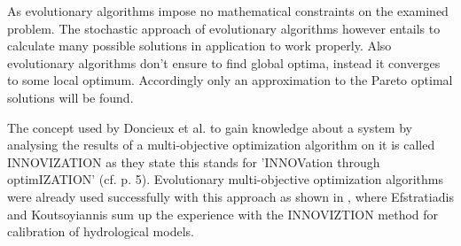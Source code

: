\documentclass[12pt,twoside]{article}
\theoremstyle{plain}
\theoremstyle{definition}
\theoremstyle{remark}
\begin{document}
As evolutionary algorithms impose no mathematical constraints on the examined problem. The stochastic approach of evolutionary algorithms however entails to calculate many possible solutions in application to work properly. Also evolutionary algorithms don't ensure to find global optima, instead it converges to some local optimum. Accordingly only an approximation to the Pareto optimal solutions will be found.

The concept used by Doncieux et al. to gain knowledge about a system by analysing the results of a multi-objective optimization algorithm on it is called INNOVIZATION as they state this stands for 'INNOVation through optimIZATION' (cf. \cite{doncieux2015multi} p. 5).
Evolutionary multi-objective optimization algorithms were already used successfully with this approach as shown in \cite{efstratiadis2010one}, where Efstratiadis and Koutsoyiannis sum up the experience with the INNOVIZTION method for calibration of hydrological models.
\end{document}

